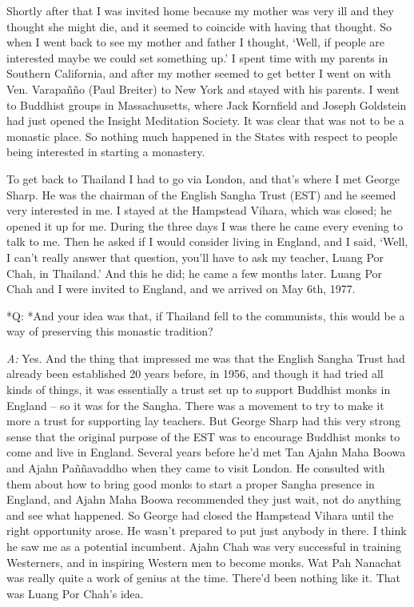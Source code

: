 Shortly after that I was invited home because my mother was very ill and
they thought she might die, and it seemed to coincide with having that
thought. So when I went back to see my mother and father I thought, 
`Well, if people are interested maybe we could set something up.' I
spent time with my parents in Southern California, and after my mother
seemed to get better I went on with Ven. Varapañño (Paul Breiter) to New
York and stayed with his parents. I went to Buddhist groups in
Massachusetts, where Jack Kornfield and Joseph Goldstein had just opened
the Insight Meditation Society. It was clear that was not to be a
monastic place. So nothing much happened in the States with respect to
people being interested in starting a monastery. 

To get back to Thailand I had to go via London, and that's where I met
George Sharp. He was the chairman of the English Sangha Trust (EST) and
he seemed very interested in me. I stayed at the Hampstead Vihara, which
was closed; he opened it up for me. During the three days I was there he
came every evening to talk to me. Then he asked if I would consider
living in England, and I said, `Well, I can't really answer that
question, you'll have to ask my teacher, Luang Por Chah, in Thailand.'
And this he did; he came a few months later. Luang Por Chah and I were
invited to England, and we arrived on May 6th, 1977. 

*Q: *And your idea was that, if Thailand fell to the communists, this
would be a way of preserving this monastic tradition? 

\emph{A:} Yes. And the thing that impressed me was that the English
Sangha Trust had already been established 20 years before, in 1956, and
though it had tried all kinds of things, it was essentially a trust set
up to support Buddhist monks in England -- so it was for the Sangha.
There was a movement to try to make it more a trust for supporting lay
teachers. But George Sharp had this very strong sense that the original
purpose of the EST was to encourage Buddhist monks to come and live in
England. Several years before he'd met Tan Ajahn Maha Boowa and Ajahn
Paññavaddho when they came to visit London. He consulted with them about
how to bring good monks to start a proper Sangha presence in England, 
and Ajahn Maha Boowa recommended they just wait, not do anything and see
what happened. So George had closed the Hampstead Vihara until the right
opportunity arose. He wasn't prepared to put just anybody in there. I
think he saw me as a potential incumbent. Ajahn Chah was very successful
in training Westerners, and in inspiring Western men to become monks. 
Wat Pah Nanachat was really quite a work of genius at the time. There'd
been nothing like it. That was Luang Por Chah's idea. 

